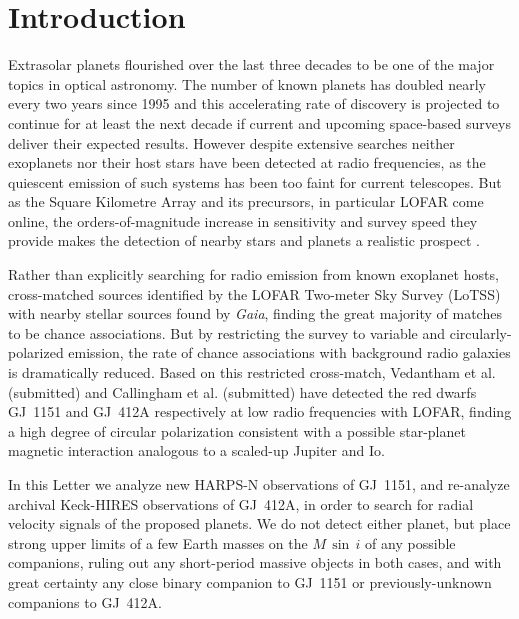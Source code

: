 \documentclass[modern]{aastex62}
\newcommand{\gaia}{\textit{Gaia}\xspace}
\begin{document}
\section{Introduction} 
\label{sec:intro}

Extrasolar planets flourished over the last three decades to be one of the major topics in optical astronomy. The number of known planets has doubled nearly every two years since 1995 \citep{Mamajek2016} and this accelerating rate of discovery is projected to continue for at least the next decade if current and upcoming space-based surveys deliver their expected results. However despite extensive searches \citep{2000ApJ...545.1058B,2013A&A...552A..65L,2018MNRAS.tmp.1077L} neither exoplanets nor their host stars have been detected at radio frequencies, as the quiescent emission of such systems has been too faint for current telescopes. But as the Square Kilometre Array \citep[SKA;][]{2009IEEEP..97.1482D} and its precursors, in particular LOFAR \citep[the LOw-Frequency ARray:][]{lofar} come online, the orders-of-magnitude increase in sensitivity and survey speed they provide makes the detection of nearby stars and planets a realistic prospect \citep{pope19}. 

Rather than explicitly searching for radio emission from known exoplanet hosts, \citet{Callingham_2019} cross-matched sources identified by the LOFAR Two-meter Sky Survey (LoTSS) with nearby stellar sources found by \gaia, finding the great majority of matches to be chance associations. But by restricting the survey to variable and circularly-polarized emission, the rate of chance associations with background radio galaxies is dramatically reduced. Based on this restricted cross-match, Vedantham et al. (submitted) and Callingham et al. (submitted) have detected the red dwarfs GJ~1151 and GJ~412A \citep[M1.0:][]{} respectively at low radio frequencies with LOFAR, finding a high degree of circular polarization consistent with a possible star-planet magnetic interaction analogous to a scaled-up Jupiter and Io. 

In this Letter we analyze new HARPS-N \citep[High Accuracy Radial velocity Planet Searcher:][]{harpsn} observations of GJ~1151, and re-analyze archival Keck-HIRES \citep{hires} observations of GJ~412A, in order to search for radial velocity signals of the proposed planets. We do not detect either planet, but place strong upper limits of a few Earth masses on the $M\,\sin\,{i}$ of any possible companions, ruling out any short-period massive objects in both cases, and with great certainty any close binary companion to GJ~1151 or previously-unknown companions to GJ~412A.  
\end{document}
